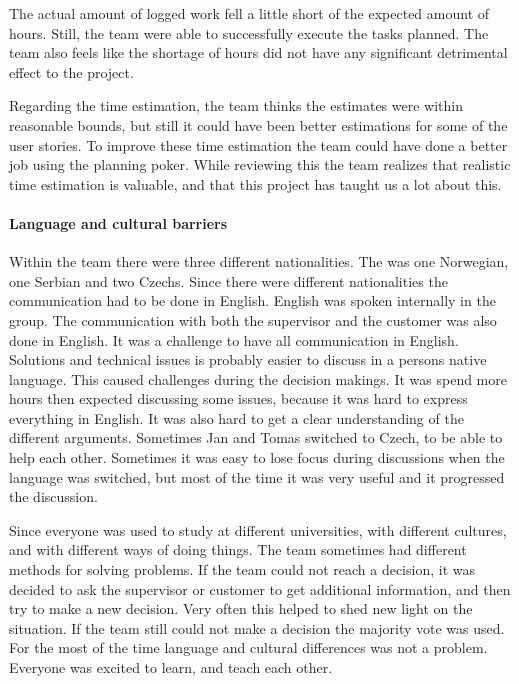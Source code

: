 The actual amount of logged work fell a little short of the expected amount of hours. Still, the team were able to successfully execute the tasks  planned. The team also feels like the shortage of hours did not have any significant detrimental effect to the project. 

Regarding the time estimation, the team thinks the estimates were within reasonable bounds, but still it could have been better estimations for some of the user stories. To improve these time estimation the team could have done a better job using the planning poker. While reviewing this the team realizes that realistic time estimation is valuable, and that this project has taught us a lot about this.

\paragraph{Language and cultural barriers}

Within the team there were three different nationalities. The was one Norwegian, one Serbian and two Czechs. Since there were different nationalities the communication had to be done in English. English was spoken internally in the group. The communication with both the supervisor and the customer
was also done in English. It was a challenge to have all communication in English. Solutions and technical issues is probably easier to discuss in a persons native language. This caused challenges during the decision makings. It was spend more hours then expected discussing some issues, because it was hard to express everything in English. It was also hard to get a clear understanding of the different arguments. Sometimes Jan and Tomas switched to Czech, to be able to help each other. Sometimes it was easy to lose focus during discussions when the language was switched, but most of the time it was very useful and it progressed the discussion.

Since everyone was used to study at different universities, with different cultures, and with different ways of doing things. The team sometimes had different methods for solving problems. If the team could not reach a decision, it was decided to ask the supervisor or customer to get additional information, and then try to make a new decision. Very often this helped to shed new light on the situation. If the team still could not make a decision the majority vote was used. For the most of the time language and cultural differences was not a problem. Everyone was excited to learn, and teach each other. 

